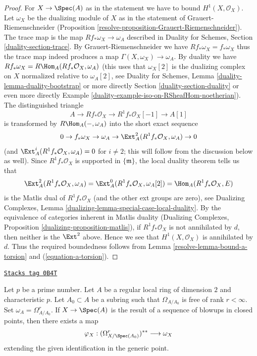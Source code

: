 \begin{proof}

For $X \to \Spec(A)$ as in the statement we have to bound
$H^1(X, \mathcal{O}_X)$. Let $\omega_X$ be the dualizing module
of $X$ as in the statement of Grauert-Riemenschneider
(Proposition \ref{resolve-proposition-Grauert-Riemenschneider}).
The trace map is the map $Rf_*\omega_X \to \omega_A$ described
in Duality for Schemes, Section \ref{duality-section-trace}.
By Grauert-Riemenschneider we have $Rf_*\omega_X = f_*\omega_X$
thus the trace map indeed produces a map $\Gamma(X, \omega_X) \to \omega_A$.
By duality we have $Rf_*\omega_X = R\Hom_A(Rf_*\mathcal{O}_X, \omega_A)$
(this uses that $\omega_X[2]$ is the dualizing complex on $X$
normalized relative to $\omega_A[2]$,
see Duality for Schemes, Lemma \ref{duality-lemma-duality-bootstrap}
or more directly Section \ref{duality-section-duality} or even more directly
Example \ref{duality-example-iso-on-RSheafHom-noetherian}).
The distinguished triangle
$$
A \to Rf_*\mathcal{O}_X \to R^1f_*\mathcal{O}_X[-1] \to A[1]
$$
is transformed by $R\Hom_A(-, \omega_A)$ into the short exact sequence
$$
0 \to f_*\omega_X \to \omega_A \to
\Ext_A^2(R^1f_*\mathcal{O}_X, \omega_A) \to 0
$$
(and $\Ext_A^i(R^1f_*\mathcal{O}_X, \omega_A) = 0$ for $i \not = 2$;
this will follow from the discussion below as well).
Since $R^1f_*\mathcal{O}_X$ is supported in $\{\mathfrak m\}$, the
local duality theorem tells us that
$$
\Ext_A^2(R^1f_*\mathcal{O}_X, \omega_A) =
\Ext_A^0(R^1f_*\mathcal{O}_X, \omega_A[2]) =
\Hom_A(R^1f_*\mathcal{O}_X, E)
$$
is the Matlis dual of $R^1f_*\mathcal{O}_X$ (and the other
ext groups are zero), see
Dualizing Complexes, Lemma \ref{dualizing-lemma-special-case-local-duality}.
By the equivalence of categories inherent in Matlis duality
(Dualizing Complexes, Proposition \ref{dualizing-proposition-matlis}),
if $R^1f_*\mathcal{O}_X$ is not annihilated by $d$,
then neither is the $\Ext^2$ above. Hence we see that
$H^1(X, \mathcal{O}_X)$ is annihilated by $d$. Thus the required
boundedness follows from Lemma \ref{resolve-lemma-bound-a-torsion} and
(\ref{equation-a-torsion}).
\end{proof}

\begin{lemma}
\label{resolve-lemma-compare-differentials-dualizing}
\href{https://stacks.math.columbia.edu/tag/0B4T}{\texttt{Stacks tag 0B4T}}

Let $p$ be a prime number.
Let $A$ be a regular local ring of dimension $2$ and characteristic $p$.
Let $A_0 \subset A$ be a subring such that $\Omega_{A/A_0}$ is free
of rank $r < \infty$. Set $\omega_A = \Omega^r_{A/A_0}$. If $X \to \Spec(A)$
is the result of a sequence of blowups in closed points, then
there exists a map
$$
\varphi_X : (\Omega^r_{X/\Spec(A_0)})^{**} \longrightarrow \omega_X
$$
extending the given identification in the generic point.
\end{lemma}

